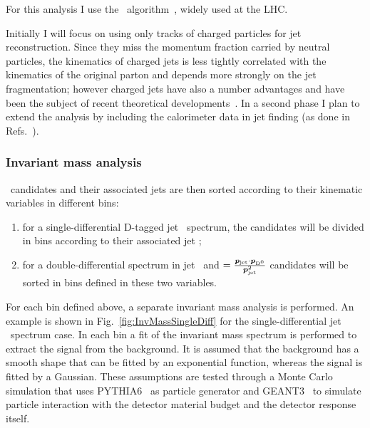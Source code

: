 \documentclass[12pt, a4paper, twoside, titlepage]{article}
\begin{document}
For this analysis I use the \antikt\ algorithm~\cite{Cacciari:2008c}, widely used at the LHC.

Initially I will focus on using only tracks of charged particles for jet reconstruction. Since they miss the momentum
fraction carried by neutral particles, the kinematics of charged jets is less tightly correlated with the kinematics
of the original parton and depends more strongly on the jet fragmentation; however charged jets have also a number advantages
and have been the subject of recent theoretical developments~\cite{Thaler:2013}.
In a second phase I plan to extend the analysis by including the calorimeter data in jet finding (as done in Refs.~\cite{ALICE:2013c, ALICE:2015a}).

\subsubsection{Invariant mass analysis}
\Dzero\ candidates and their associated jets are then sorted according to their kinematic variables in different bins:
\begin{enumerate}
\item for a single-differential D-tagged jet \pt\ spectrum, the candidates will be divided in bins according to their associated jet \pt;
\item for a double-differential spectrum in jet \pt\ and \zpar$=\frac{\bm{p}_{\rm jet}\cdot{\bm{p}}_{\rm D^0}}{\bm{p}_{\rm jet}^2}$ candidates will
be sorted in bins defined in these two variables.
\end{enumerate}
For each bin defined above, a separate invariant mass analysis is performed. An example is shown in Fig.~\ref{fig:InvMassSingleDiff} for the single-differential
jet \pt\ spectrum case. 
In each bin a fit of the invariant mass spectrum is performed to extract the signal from the background. It is assumed that the background has
a smooth shape that can be fitted by an exponential function, whereas the signal is fitted by a Gaussian. These assumptions are tested
through a Monte Carlo simulation that uses PYTHIA6~\cite{Sjostrand:2006} as particle generator and GEANT3~\cite{GEANT3-url} to simulate particle interaction
with the detector material budget and the detector response itself.
\end{document}
